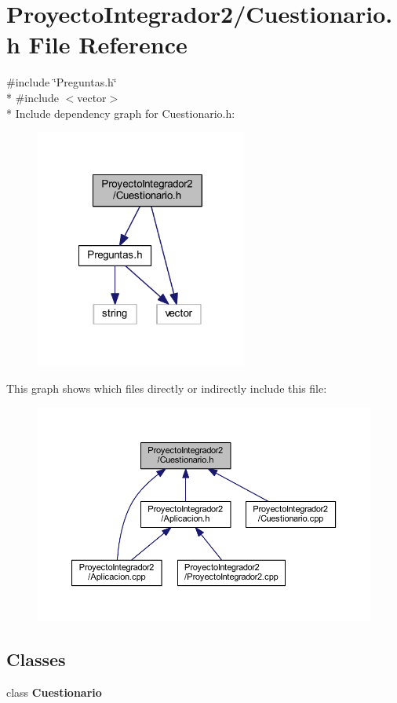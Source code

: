 \section{Proyecto\-Integrador2/\-Cuestionario.h File Reference}
\label{_cuestionario_8h}
{\ttfamily \#include \char`\"{}Preguntas.\-h\char`\"{}}\\*
{\ttfamily \#include $<$vector$>$}\\*
Include dependency graph for Cuestionario.\-h\-:\nopagebreak
\begin{figure}[H]
\begin{center}
\leavevmode
\includegraphics[width=197pt]{_cuestionario_8h__incl}
\end{center}
\end{figure}
This graph shows which files directly or indirectly include this file\-:\nopagebreak
\begin{figure}[H]
\begin{center}
\leavevmode
\includegraphics[width=350pt]{_cuestionario_8h__dep__incl}
\end{center}
\end{figure}
\subsection*{Classes}
\begin{DoxyCompactItemize}
\item 
class {\bf Cuestionario}
\end{DoxyCompactItemize}
